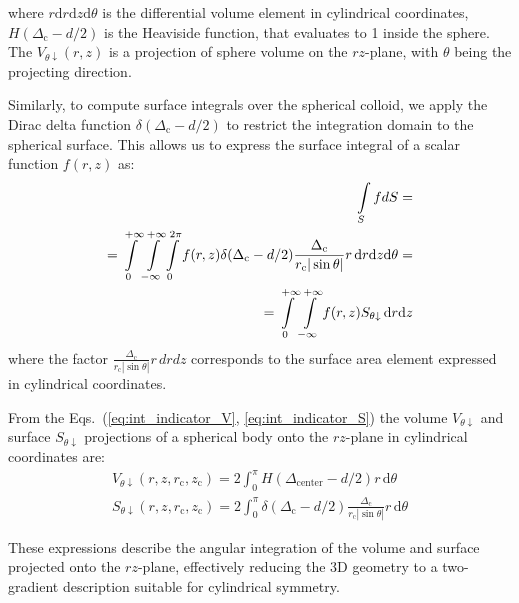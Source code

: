 \documentclass[10pt, a4paper, twocolumn]{article}
\begin{document}
where $r \text{d}r \text{d}z \text{d}\theta$ is the differential volume element in cylindrical coordinates, $H(\Delta_{\text{c}} - d/2)$ is the Heaviside function, that evaluates to 1 inside the sphere.
The $V_{\theta \downarrow}(r,z)$ is a projection of sphere volume on the $rz$-plane, with $\theta$ being the projecting direction.

Similarly, to compute surface integrals over the spherical colloid, we apply the Dirac delta function $\delta(\Delta_{\text{c}} - d/2)$ to restrict the integration domain to the spherical surface.
This allows us to express the surface integral of a scalar function $f(r,z)$ as:
\begin{eqnarray}
    \label{eq:int_indicator_S}
    \begin{aligned}
        \int\limits_{S} f dS = \\
        = \int\displaylimits_{0}^{+\infty} \int\displaylimits_{-\infty}^{+\infty} \int\displaylimits_{0}^{2\pi} f(r, z) \delta(\Delta_{\text{c}} - d/2)  \frac{\Delta_{\text{c}}}{r_{\text{c}} |\sin\theta|} r \, \text{d}r \text{d}z \text{d}\theta=\\
        =\int\displaylimits_{0}^{+\infty} \int\displaylimits_{-\infty}^{+\infty} f(r, z)  S_{\theta \downarrow} \, \text{d}r \text{d}z
    \end{aligned}
\end{eqnarray}
where the factor $\frac{\Delta_{\text{c}}}{r_{\text{c}} |\sin\theta|}r \, dr dz$ corresponds to the surface area element expressed in cylindrical coordinates.


From the Eqs.~(\ref{eq:int_indicator_V}, \ref{eq:int_indicator_S}) the volume $V_{\theta \downarrow}$ and surface $S_{\theta \downarrow}$ projections of a spherical body onto the $rz$-plane in cylindrical coordinates are:
\begin{gather}
    V_{\theta \downarrow}(r, z, r_{\text{c}}, z_{\text{c}}) = 2\int_{0}^{\pi} H\!\left( \Delta_{\text{center}} - {d}/{2} \right) r \, \text{d}\theta
    \\
    S_{\theta \downarrow}(r, z, r_{\text{c}}, z_{\text{c}}) = 2\int_{0}^{\pi}\delta(\Delta_{\text{c}} - d/2)  \frac{\Delta_{\text{c}}}{r_{\text{c}} |\sin\theta|} r \, \text{d}\theta
\end{gather}

These expressions describe the angular integration of the volume and surface projected onto the $rz$-plane, effectively reducing the 3D geometry to a two-gradient description suitable for cylindrical symmetry.
\end{document}
